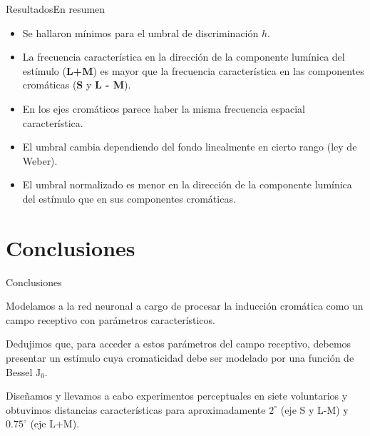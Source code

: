 \documentclass[
    11pt, %
    aspectratio=169, %
]{beamer}
\begin{document}
\begin{frame}{Resultados}{En resumen}
    \begin{itemize}
        \item Se hallaron mínimos para el umbral de discriminación $h$.
        \item La frecuencia característica en la dirección de la componente lumínica del estímulo (\textbf{L+M}) es mayor que la frecuencia característica en las componentes cromáticas (\textbf{S} y \textbf{L - M}).
        \item En los ejes cromáticos parece haber la misma frecuencia espacial característica.
        \item El umbral cambia dependiendo del fondo linealmente en cierto rango (ley de Weber).
        \item El umbral normalizado es menor en la dirección de la componente lumínica del estímulo que en sus componentes cromáticas.
        
    \end{itemize}
\end{frame}








\section{Conclusiones}
\begin{frame}{Conclusiones}
    \begin{block}{}
    Modelamos a la red neuronal a cargo de procesar la inducción cromática como un campo receptivo con parámetros característicos.
    	\end{block}
\begin{exampleblock}{}
    Dedujimos que, para acceder a estos parámetros del campo receptivo, debemos presentar un estímulo cuya cromaticidad debe ser modelado por una función de Bessel $\text{J}_0$.		
      
      
    	\end{exampleblock}

\begin{alertblock}{}
            Diseñamos y llevamos a cabo experimentos perceptuales en siete voluntarios y obtuvimos distancias características para aproximadamente $2^\circ$ (eje S y L-M) y $0.75^\circ$ (eje L+M).
    	\end{alertblock}

\end{frame}
\end{document}
